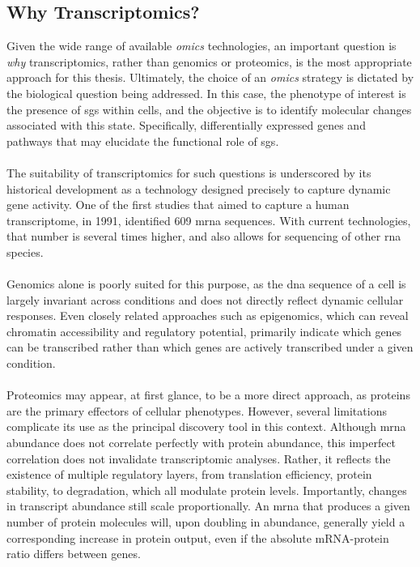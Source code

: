 \subsection{Why Transcriptomics?}

Given the wide range of available \textit{omics} technologies, an important question is \textit{why} transcriptomics, rather than genomics or proteomics, is the most appropriate approach for this thesis. Ultimately, the choice of an \textit{omics} strategy is dictated by the biological question being addressed. In this case, the phenotype of interest is the presence of \glspl{sg} within cells, and the objective is to identify molecular changes associated with this state. Specifically, differentially expressed genes and pathways that may elucidate the functional role of \glspl{sg}.
\\
\\
The suitability of transcriptomics for such questions is underscored by its historical development as a technology designed precisely to capture dynamic gene activity\cite{lowe_transcriptomics_2017, chu_rna_2012}. One of the first studies that aimed to capture a human transcriptome, in 1991, identified 609 \gls{mrna} sequences\cite{adams_complementary_1991}. With current technologies, that number is several times higher, and also allows for sequencing of other \gls{rna} species\cite{lowe_transcriptomics_2017, chu_rna_2012}. 
\\
\\
Genomics alone is poorly suited for this purpose, as the \gls{dna} sequence of a cell is largely invariant across conditions and does not directly reflect dynamic cellular responses\cite{lowe_transcriptomics_2017, chu_rna_2012}. Even closely related approaches such as epigenomics, which can reveal chromatin accessibility and regulatory potential, primarily indicate which genes can be transcribed rather than which genes are actively transcribed under a given condition\cite{lowe_transcriptomics_2017}.
\\
\\
Proteomics may appear, at first glance, to be a more direct approach, as proteins are the primary effectors of cellular phenotypes\cite{begum_western_2022}. However, several limitations complicate its use as the principal discovery tool in this context. Although \gls{mrna} abundance does not correlate perfectly with protein abundance, this imperfect correlation does not invalidate transcriptomic analyses\cite{edfors_gene-specific_2016, koussounadis_relationship_2015}. Rather, it reflects the existence of multiple regulatory layers, from translation efficiency, protein stability, to degradation, which all modulate protein levels\cite{edfors_gene-specific_2016, koussounadis_relationship_2015}. Importantly, changes in transcript abundance still scale proportionally. An \gls{mrna} that produces a given number of protein molecules will, upon doubling in abundance, generally yield a corresponding increase in protein output, even if the absolute mRNA-protein ratio differs between genes\cite{edfors_gene-specific_2016, koussounadis_relationship_2015}.
